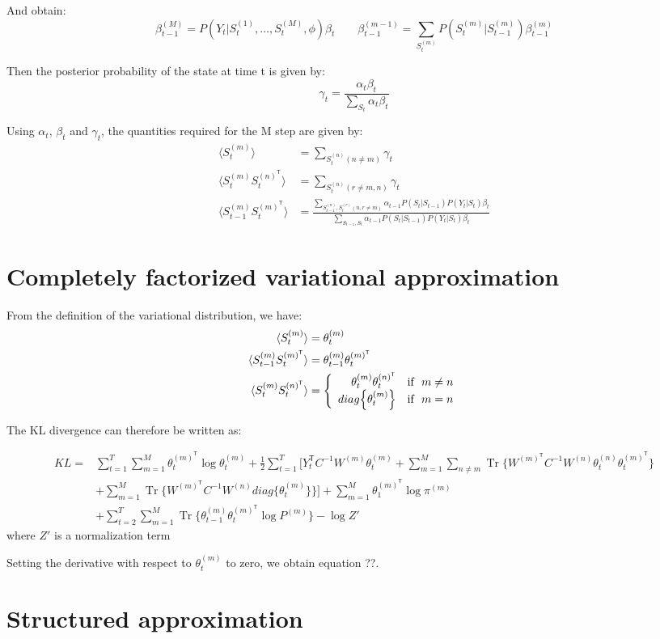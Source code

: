 \documentclass{article}
\DeclareMathOperator{\Tr}{Tr}
\begin{document}
And obtain:
\[ \beta_{t-1}^{(M)} = P(Y_t | S_t^{(1)},\dots,S_t^{(M)}, \phi) \beta_t \qquad \beta_{t-1}^{(m-1)} = \sum_{S_{t}^{(m)}} P(S_t^{(m)} | S_{t-1}^{(m)}) \beta_{t-1}^{(m)} \]

Then the posterior probability of the state at time t is given by:
\[ \gamma_t = \frac{\alpha_t \beta_t}{\sum_{S_t} \alpha_t \beta_t} \]

Using $\alpha_t$, $\beta_t$ and $\gamma_t$, the quantities required for the M step are given by:
\begin{align*}
\langle S_t^{(m)} \rangle &= \sum_{S_t^{(n)} (n \ne m)} \gamma_t \\
\langle S_t^{(m)} S_t^{(n)^\mathsf{T}} \rangle &= \sum_{S_t^{(n)} (r \ne m,n)} \gamma_t \\
\langle S_{t-1}^{(m)} S_t^{(m)^\mathsf{T}} \rangle &= \frac{\sum_{S_{t-1}^{(n)},S_t^{(r)} (n,r \ne m)} \alpha_{t-1} P(S_t | S_{t-1}) P(Y_t | S_t) \beta_t}{\sum_{S_{t-1},S_t} \alpha_{t-1} P(S_t | S_{t-1}) P(Y_t | S_t) \beta_t}
\end{align*}

\section{Completely factorized variational approximation}

From the definition of the variational distribution, we have:
\begin{align*}
\langle S_t^{(m)} \rangle &= \theta_t^{(m)} \\
\langle S_{t-1}^{(m)} S_t^{(m)^\mathsf{T}} \rangle &= \theta_{t-1}^{(m)} \theta_t^{(m)^\mathsf{T}} \\
\langle S_t^{(m)} S_t^{(n)^\mathsf{T}} \rangle &= \left\{
  \begin{array}{rcr}
    \theta_{t}^{(m)} \theta_t^{(n)^\mathsf{T}} \quad \textnormal{if} \ \ m \ne n \\
    diag\Big\{\theta_t^{(m)}\Big\} \quad \textnormal{if} \ \ m = n \\
  \end{array}
\right.
\end{align*}

The KL divergence can therefore be written as:

\begin{align*}
KL = &\sum_{t=1}^T \sum_{m=1}^M \theta_t^{(m)^\mathsf{T}} \log \theta_t^{(m)} + \frac{1}{2} \sum_{t=1}^T \Bigg[ Y_t^\mathsf{T} C^{-1} W^{(m)} \theta_t^{(m)} + \sum_{m=1}^M \sum_{n \ne m} \Tr\bigg\{ W^{(m)^\mathsf{T}} C^{-1} W^{(n)} \theta_t^{(n)} \theta_t^{(m)^\mathsf{T}} \bigg\} \\
&+ \sum_{m=1}^M \Tr\bigg\{ W^{(m)^\mathsf{T}} C^{-1} W^{(n)} diag\Big\{\theta_t^{(m)}\Big\} \bigg\} \Bigg] + \sum_{m=1}^M \theta_1^{(m)^\mathsf{T}} \log \pi^{(m)} \\
&+ \sum_{t=2}^T \sum_{m=1}^M \Tr\bigg\{ \theta_{t-1}^{(m)} \theta_t^{(m)^\mathsf{T}} \log P^{(m)} \bigg\} - \log Z'
\end{align*}
where $Z'$ is a normalization term

Setting the derivative with respect to $\theta_t^{(m)}$ to zero, we obtain equation ??.

\section{Structured approximation}
\end{document}

